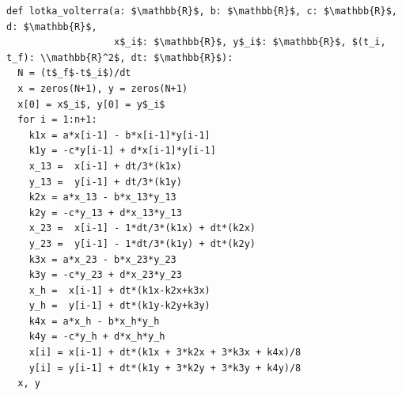\documentclass[border=10pt]{standalone}
\begin{document}
\begin{lstlisting}
def lotka_volterra(a: $\mathbb{R}$, b: $\mathbb{R}$, c: $\mathbb{R}$, d: $\mathbb{R}$,
                   x$_i$: $\mathbb{R}$, y$_i$: $\mathbb{R}$, $(t_i, t_f): \\mathbb{R}^2$, dt: $\mathbb{R}$): 
  N = (t$_f$-t$_i$)/dt
  x = zeros(N+1), y = zeros(N+1)
  x[0] = x$_i$, y[0] = y$_i$
  for i = 1:n+1:
    k1x = a*x[i-1] - b*x[i-1]*y[i-1]
    k1y = -c*y[i-1] + d*x[i-1]*y[i-1]
    x_13 =  x[i-1] + dt/3*(k1x)
    y_13 =  y[i-1] + dt/3*(k1y)
    k2x = a*x_13 - b*x_13*y_13
    k2y = -c*y_13 + d*x_13*y_13
    x_23 =  x[i-1] - 1*dt/3*(k1x) + dt*(k2x)
    y_23 =  y[i-1] - 1*dt/3*(k1y) + dt*(k2y)
    k3x = a*x_23 - b*x_23*y_23
    k3y = -c*y_23 + d*x_23*y_23
    x_h =  x[i-1] + dt*(k1x-k2x+k3x)
    y_h =  y[i-1] + dt*(k1y-k2y+k3y)
    k4x = a*x_h - b*x_h*y_h
    k4y = -c*y_h + d*x_h*y_h
    x[i] = x[i-1] + dt*(k1x + 3*k2x + 3*k3x + k4x)/8
    y[i] = y[i-1] + dt*(k1y + 3*k2y + 3*k3y + k4y)/8
  x, y
\end{lstlisting}
\end{document}
